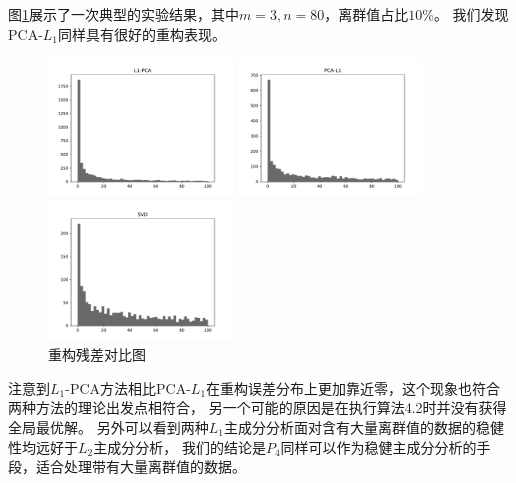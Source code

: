 图\ref{compare-con-error}展示了一次典型的实验结果，其中$m = 3, n = 80$，离群值占比$10\%$。
我们发现PCA-$L_1$同样具有很好的重构表现。

\begin{figure}[H]
    \centering
    \begin{minipage}[t]{0.3\textwidth}
    \includegraphics[width=4.9cm]{pics/lab1/l1-pca.pdf}
    \end{minipage}
    \begin{minipage}[t]{0.3\textwidth}
    \includegraphics[width=4.9cm]{pics/lab1/pca-l1.pdf}
    \end{minipage}
    \begin{minipage}[t]{0.3\textwidth}
    \includegraphics[width=4.9cm]{pics/lab1/svd.pdf}
    \end{minipage}
    \caption{重构残差对比图}
    \label{compare-con-error}
\end{figure}

注意到$L_1$-PCA方法相比PCA-$L_1$在重构误差分布上更加靠近零，这个现象也符合两种方法的理论出发点相符合，
另一个可能的原因是在执行算法4.2时并没有获得全局最优解。
另外可以看到两种$L_1$主成分分析面对含有大量离群值的数据的稳健性均远好于$L_2$主成分分析，
我们的结论是$P_4$同样可以作为稳健主成分分析的手段，适合处理带有大量离群值的数据。

